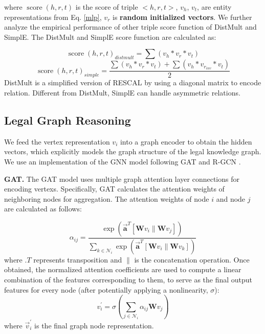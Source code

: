 \documentclass[runningheads]{llncs}
\begin{document}
where $\operatorname{score}(h, r, t)$ is the score of triple $<h,r,t>$, $v_h$, $v_t$, are entity representations from Eq. \ref{mlp}, $v_r$ is \textbf{random initialized vectors}. We further analyze the empirical performance of
other triple score function of  DistMult and SimplE.  The DistMult and SimplE score function are  calculated as: 
 
\begin{equation}
    \operatorname{score}(h, r, t)_{distmult}=\sum\left(v_{h} * v_{r} * v_{t}\right) 
\end{equation}
\begin{equation}
    \operatorname{score}(h, r, t)_{simple}=\frac{\sum\left(v_{h} * v_{r} * v_{t}\right)+\sum\left(v_{h} * v_{r_{i n v}} * v_{t}\right)}{2}
    \label{simple}
\end{equation}
DistMult is a simplified version of RESCAL \cite{RESCAL:conf/icml/NickelTK11} by using a diagonal matrix to encode relation. Different from DistMult, SimplE can handle asymmetric relations. %

\subsection{Legal Graph Reasoning\label{graph_sec}}
We feed the vertex representation $v_i$ into a graph encoder to obtain the hidden vectors, which explicitly models the graph structure of the legal knowledge graph.  We use an implementation of the GNN model following GAT \cite{velickovic2018graph} and R-GCN \cite{schlichtkrull2018modeling}.  %

\textbf{GAT.} The GAT model uses multiple graph attention layer connections for encoding vertexs. Specifically, GAT calculates the attention weights of neighboring nodes for aggregation. The attention weights of node $i$ and node $j$ are calculated as follows:

\begin{equation}
\alpha_{i j}=\frac{\exp \left(\overrightarrow{\mathbf{a}}^{T}\left[\mathbf{W} v_{i} \| \mathbf{W} v_{j}\right]\right)}{\sum_{k \in \mathcal{N}_{i}} \exp \left(\overrightarrow{\mathbf{a}}^{T}\left[\mathbf{W}  v_{i} \| \mathbf{W} v_{k}\right]\right)}
\end{equation}
where $. T$ represents transposition and $\|$ is the concatenation operation. Once obtained, the normalized attention coefficients are used to compute a linear combination of the features corresponding to them, to serve as the final output features for every node (after potentially applying a nonlinearity, $\sigma$):
\begin{equation}
     v_{i}^{\prime}=\sigma\left(\sum_{j \in \mathcal{N}_{i}} \alpha_{i j} \mathbf{W} v_{j}\right)
\end{equation}
where $\vec{v}_{i}^{\prime}$ is the final graph node representation. 
\end{document}
